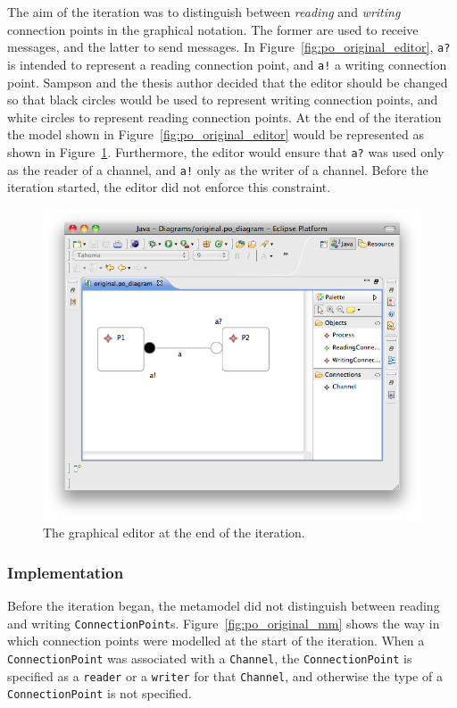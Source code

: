 The aim of the iteration was to distinguish between \emph{reading} and \emph{writing} connection points in the graphical notation. The former are used to receive messages, and the latter to send messages. In Figure~\ref{fig:po_original_editor}, \texttt{a?} is intended to represent a reading connection point, and \texttt{a!} a writing connection point. Sampson and the thesis author decided that the editor should be changed so that black circles would be used to represent writing connection points, and white circles to represent reading connection points. At the end of the iteration the model shown in Figure~\ref{fig:po_original_editor} would be represented as shown in Figure~\ref{fig:po_evolved_editor}. Furthermore, the editor would ensure that \texttt{a?} was used only as the reader of a channel, and \texttt{a!} only as the writer of a channel. Before the iteration started, the editor did not enforce this constraint.

\begin{figure}[htbp]
	\centering
	\includegraphics[width=13.5cm]{6.Evaluation/images/user_driven/po_evolved_editor.png}
	\caption{The graphical editor at the end of the iteration.}
	\label{fig:po_evolved_editor}
\end{figure}


\subsubsection{Implementation}
Before the iteration began, the metamodel did not distinguish between reading and writing \texttt{Co\-nn\-ec\-ti\-o\-nPo\-i\-nt}s. Figure~\ref{fig:po_original_mm} shows the way in which connection points were modelled at the start of the iteration. When a \texttt{Co\-nn\-ec\-ti\-o\-nPo\-i\-nt} was associated with a \texttt{Ch\-an\-nel}, the  \texttt{Co\-nn\-ec\-ti\-o\-nPo\-i\-nt} is specified as a \texttt{re\-ad\-er} or a \texttt{wr\-it\-er} for that \texttt{Ch\-an\-nel}, and otherwise the type of a \texttt{Co\-nn\-ec\-ti\-o\-nPo\-i\-nt} is not specified.

